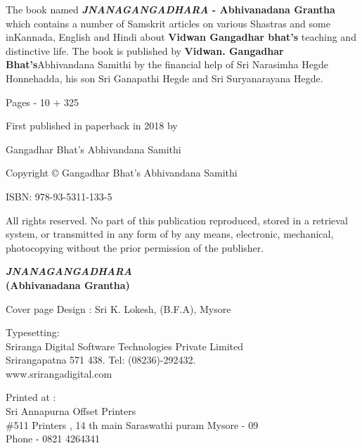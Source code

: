 \thispagestyle{empty}
{\fontsize{10}{12}\selectfont

The book named \textbf{\emph{JNANAGANGADHARA }- Abhivanadana Grantha} which contains a number of Samskrit articles on various Shastras and some in\break Kannada, English and Hindi about \textbf{Vidwan Gangadhar bhat’s} teaching and  distinctive life. The book is published by \textbf{Vidwan. Gangadhar Bhat’s}\break Abhivandana Samithi by the financial help of Sri Narasimha Hegde Honnehadda, his son Sri Ganapathi Hegde and Sri Suryanarayana Hegde.

\begin{flushleft}

\bigskip
Pages - 10 + 325

First published in paperback in 2018 by

Gangadhar Bhat’s Abhivandana Samithi

Copyright © Gangadhar Bhat’s Abhivandana Samithi

\bigskip
ISBN: 978-93-5311-133-5

\bigskip
All rights reserved. No part of this publication reproduced, stored in a retrieval system, or transmitted in any form of by any means, electronic, mechanical, photocopying without the prior permission of the publisher.
\vfill
\begin{center}
\textbf{{\Large \emph{JNANAGANGADHARA}}\\
(Abhivanadana Grantha)}
\end{center}
\vfill
 
\bigskip
Cover page Design : Sri K. Lokesh, (B.F.A), Mysore

\bigskip
\noindent
Typesetting:\\ 
{\selectfont Sriranga Digital Software Technologies Private Limited}\\ 
Srirangapatna 571 438. Tel: (08236)-292432.\\
www.srirangadigital.com
\vfill

\bigskip
Printed at :\\
Sri Annapurna Offset Printers\\
\#511 Printers , 14 th main Saraswathi puram Mysore - 09\\
Phone - 0821 4264341

\end{flushleft}

}

